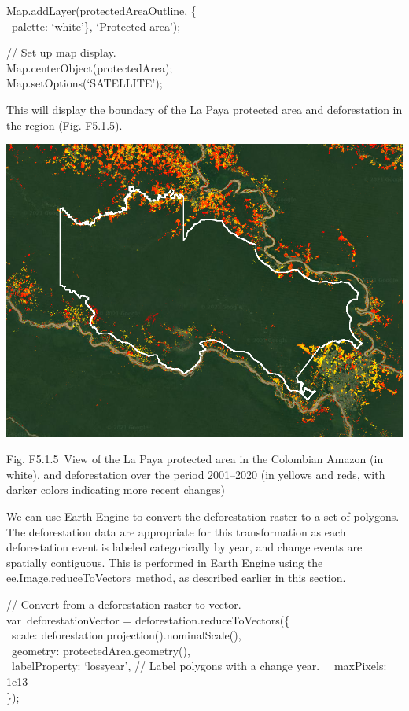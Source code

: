 \documentclass[
  letterpaper,
  DIV=11,
  numbers=noendperiod]{scrreprt}
\begin{document}
Map.addLayer(protectedAreaOutline, \{\\
\hspace*{0.333em} ~palette: `white'\}, `Protected area');

// Set up map display.\\
Map.centerObject(protectedArea);\\
Map.setOptions(`SATELLITE');

This will display the boundary of the La Paya protected area and
deforestation in the region (Fig. F5.1.5).

\includegraphics{./F5/image55.png}

Fig. F5.1.5~View of the La Paya protected area in the Colombian Amazon
(in white), and deforestation over the period 2001--2020 (in yellows and
reds, with darker colors indicating more recent changes)

We can use Earth Engine to convert the deforestation raster to a set of
polygons. The deforestation data are appropriate for this transformation
as each deforestation event is labeled categorically by year, and change
events are spatially contiguous. This is performed in Earth Engine using
the ee.Image.reduceToVectors~method, as described earlier in this
section. ~

// Convert from a deforestation raster to vector.\\
var~deforestationVector = deforestation.reduceToVectors(\{\\
\hspace*{0.333em} ~scale: deforestation.projection().nominalScale(),\\
\hspace*{0.333em} ~geometry: protectedArea.geometry(),\\
\hspace*{0.333em} ~labelProperty: `lossyear', // Label polygons with a
change year.~ ~maxPixels: 1e13\\
\});
\end{document}
